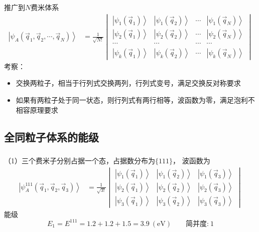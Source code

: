 \begin{frame}[label=current]
  \frametitle{}
推广到$N$费米体系
\[\begin{aligned}
  \left\vert \psi _A(\vec{q}_1,\vec{q}_2,\cdots,\vec{q}_N) \right\rangle  
  &= \frac{1}{\sqrt{N!}} \begin{vmatrix}\left\vert \psi _1(\vec{q}_1)\right\rangle  &\left\vert \psi _1(\vec{q}_2)\right\rangle &\cdots &\left\vert \psi _1(\vec{q}_N)\right\rangle \\ 
  \left\vert \psi _2(\vec{q}_1) \right\rangle & \left\vert \psi _2(\vec{q}_2)\right\rangle & \cdots &\left\vert \psi _2(\vec{q}_N)\right\rangle \\
  \cdots & \cdots & \cdots & \cdots \\
  \left\vert \psi _k(\vec{q}_1) \right\rangle & \left\vert \psi _k(\vec{q}_2)\right\rangle & \cdots & \left\vert \psi _k(\vec{q}_N)\right\rangle 
\end{vmatrix}  
\end{aligned} \]
考察：
\begin{itemize}
  \item 交换两粒子，相当于行列式交换两列，行列式变号，满足交换反对称要求
  \item 如果有两粒子处于同一状态，则行列式有两行相等，波函数为零，满足泡利不相容原理要求
\end{itemize}
\end{frame}

\subsection{全同粒子体系的能级}

\begin{frame}[label=current]
  \frametitle{}
\解 （1）三个费米子分别占据一个态，占据数分布为$\{111\}$，
波函数为 
\[\begin{aligned}
  \left\vert \psi ^{111} _A(\vec{q}_1,\vec{q}_2,\vec{q}_3) \right\rangle  
  &= \frac{1}{\sqrt{3!}} \begin{vmatrix}\left\vert \psi _1(\vec{q}_1)\right\rangle  &\left\vert \psi _1(\vec{q}_2)\right\rangle &\left\vert \psi _1(\vec{q}_3)\right\rangle \\ 
  \left\vert \psi _2(\vec{q}_1) \right\rangle & \left\vert \psi _2(\vec{q}_2)\right\rangle & \left\vert \psi _2(\vec{q}_3)\right\rangle \\
  \left\vert \psi _3(\vec{q}_1) \right\rangle & \left\vert \psi _3(\vec{q}_2)\right\rangle & \left\vert \psi _3(\vec{q}_3)\right\rangle 
\end{vmatrix}  
\end{aligned} \]
能级 
\[ E_1 = E^{111} = 1.2+1.2+1.5 =3.9~ (\text{eV}) \qquad \text{简并度:} ~1\]
\end{frame} 

